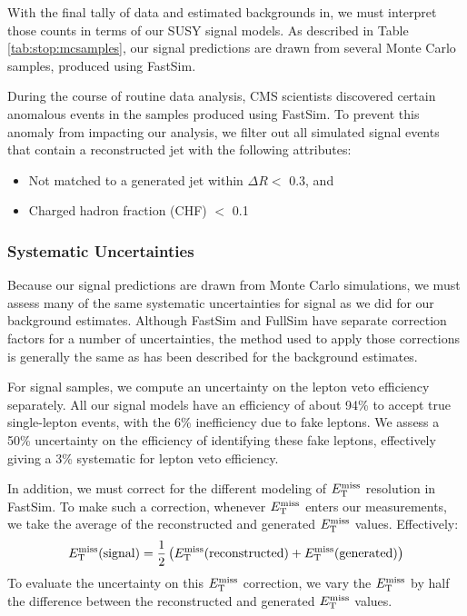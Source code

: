With the final tally of data and estimated backgrounds in, we must
interpret those counts in terms of our SUSY signal models. As
described in Table \ref{tab:stop:mcsamples}, our signal predictions
are drawn from several Monte Carlo samples, produced using FastSim.

During the course of routine data analysis, CMS scientists discovered
certain anomalous events in the samples produced using FastSim. To
prevent this anomaly from impacting our analysis, we filter out all
simulated signal events that contain a reconstructed jet with the
following attributes:
\begin{itemize}
\item Not matched to a generated jet within $\Delta R <$ 0.3, and
\item Charged hadron fraction (CHF) $<$ 0.1
\end{itemize}

\subsubsection{Systematic Uncertainties}
\label{sssec:stop:signal:systematics}

Because our signal predictions are drawn from Monte Carlo simulations,
we must assess many of the same systematic uncertainties for signal as
we did for our background estimates. Although FastSim and FullSim have
separate correction factors for a number of uncertainties, the method
used to apply those corrections is generally the same as has been
described for the background estimates.

For signal samples, we compute an uncertainty on the lepton veto
efficiency separately. All our signal models have an efficiency of
about 94\% to accept true single-lepton events, with the 6\%
inefficiency due to fake leptons. We assess a 50\% uncertainty on the
efficiency of identifying these fake leptons, effectively giving a 3\%
systematic for lepton veto efficiency.

In addition, we must correct for the different modeling of $E_\text{T}^\text{miss}$ resolution %
in FastSim. To make such a correction, whenever $E_\text{T}^\text{miss}$ enters our
measurements, we take the average of the reconstructed and generated
$E_\text{T}^\text{miss}$ values. Effectively:
\begin{equation}
E_\text{T}^\text{miss} \text{(signal)} = \frac{1}{2} \left( E_\text{T}^\text{miss} \text{(reconstructed)} + E_\text{T}^\text{miss}
  \text{(generated)} \right)
\end{equation}
To evaluate the uncertainty on this $E_\text{T}^\text{miss}$ correction, we vary the
$E_\text{T}^\text{miss}$ by half the difference between the reconstructed and generated
$E_\text{T}^\text{miss}$ values. %

